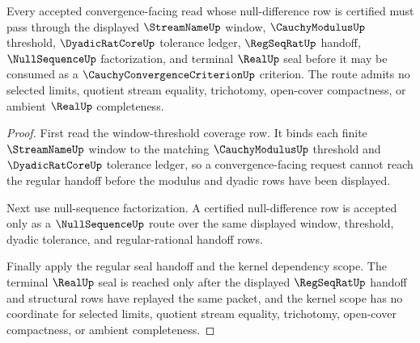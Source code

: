 \begin{theorem}
\label{thm:cauchy-convergence-criterion-modulus-tail-lock}
Every accepted convergence-facing read whose null-difference row is certified must pass through the displayed $\StreamNameUp$ window, $\CauchyModulusUp$ threshold, $\DyadicRatCoreUp$ tolerance ledger, $\RegSeqRatUp$ handoff, $\NullSequenceUp$ factorization, and terminal $\RealUp$ seal before it may be consumed as a $\CauchyConvergenceCriterionUp$ criterion. The route admits no selected limits, quotient stream equality, trichotomy, open-cover compactness, or ambient $\RealUp$ completeness.
\end{theorem}
\begin{proof}
First read the window-threshold coverage row. It binds each finite $\StreamNameUp$ window to the matching $\CauchyModulusUp$ threshold and $\DyadicRatCoreUp$ tolerance ledger, so a convergence-facing request cannot reach the regular handoff before the modulus and dyadic rows have been displayed.

Next use null-sequence factorization. A certified null-difference row is accepted only as a $\NullSequenceUp$ route over the same displayed window, threshold, dyadic tolerance, and regular-rational handoff rows.

Finally apply the regular seal handoff and the kernel dependency scope. The terminal $\RealUp$ seal is reached only after the displayed $\RegSeqRatUp$ handoff and structural rows have replayed the same packet, and the kernel scope has no coordinate for selected limits, quotient stream equality, trichotomy, open-cover compactness, or ambient completeness.
\end{proof}

